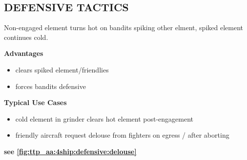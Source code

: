 \clearpage

\subsection{DEFENSIVE TACTICS}

\begin{tcoloritemize}
    \blueitem[Delouse] 
    Non-engaged element turns hot on bandits spiking other elment,
    spiked element continues cold.

    \bigskip
    \textbf{Advantages}
    \begin{itemize}
        \item clears spiked element/friendlies
        \item forces bandits defensive
    \end{itemize}

    \textbf{Typical Use Cases}
    \begin{itemize}
        \item cold element in grinder clears hot element post-engagement
        \item friendly aircraft request delouse from fighters on egress / after aborting
    \end{itemize}

    \hfill\textbf{see \cref{fig:ttp_aa:4ship:defensive:delouse}}
\end{tcoloritemize}


